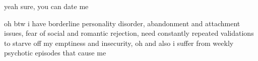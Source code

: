 \documentclass{article}
\begin{document}

yeah sure, you can date me


oh btw i have borderline personality disorder, abandonment and attachment issues, fear of social and romantic rejection, need constantly repeated validations to starve off my emptiness and insecurity, oh and also i suffer from weekly psychotic episodes that cause me

\end{document}
